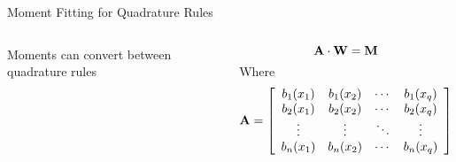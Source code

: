 \begin{frame}{Moment Fitting for Quadrature Rules}
\begin{columns}
\begin{outline}
  \1 Moments can convert between quadrature rules
\end{outline}

\begin{center}
$$
\bf{A} \cdot \bf{W} = \bf{M}
$$
Where
$$
\bf{A} = \left[
\begin{array}{cccc}
  b_1(x_1) & b_1(x_2) & \cdots & b_1(x_q) \\
  b_2(x_1) & b_2(x_2) & \cdots & b_2(x_q) \\
  \vdots & \vdots & \ddots & \vdots \\
  b_n(x_1) & b_n(x_2) & \cdots & b_n(x_q) \\
\end{array}\right]
$$
\end{center}

\end{columns}
\end{frame}


